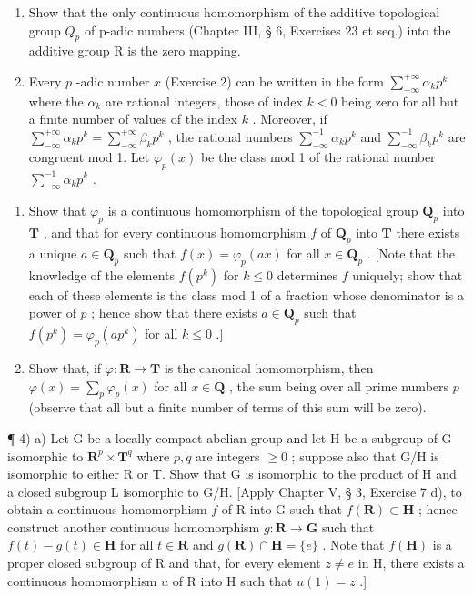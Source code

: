 \begin{enumerate}
\def\labelenumi{\arabic{enumi})}
\setcounter{enumi}{1}
\item
  Show that the only continuous homomorphism of the additive topological group \(Q_{p}\) of p-adic numbers (Chapter III, § 6, Exercises 23 et seq.) into the additive group R is the zero mapping.
\item
  Every \(p\) -adic number \(x\) (Exercise 2) can be written in the form \(\sum_{-\infty}^{+\infty} \alpha_k p^k\) where the \(\alpha_k\) are rational integers, those of index \(k < 0\) being zero for all but a finite number of values of the index \(k\) . Moreover, if \(\sum_{-\infty}^{+\infty} \alpha_k p^k = \sum_{-\infty}^{+\infty} \beta_k p^k\) , the rational numbers \(\sum_{-\infty}^{-1} \alpha_k p^k\) and \(\sum_{-\infty}^{-1} \beta_k p^k\) are congruent mod 1. Let \(\varphi_p(x)\) be the class mod 1 of the rational number \(\sum_{-\infty}^{-1} \alpha_k p^k\) .\\
\end{enumerate}

\begin{enumerate}
\def\labelenumi{\alph{enumi})}
\tightlist
\item
  Show that \(\varphi_p\) is a continuous homomorphism of the topological group \(\mathbf{Q}_p\) into \(\mathbf{T}\) , and that for every continuous homomorphism \(f\) of \(\mathbf{Q}_p\) into \(\mathbf{T}\) there exists a unique \(a \in \mathbf{Q}_p\) such that \(f(x) = \varphi_p(ax)\) for all \(x \in \mathbf{Q}_p\) . {[}Note that the knowledge of the elements \(f(p^k)\) for \(k \leqslant 0\) determines \(f\) uniquely; show that each of these elements is the class mod 1 of a fraction whose denominator is a power of \(p\) ; hence show that there exists \(a \in \mathbf{Q}_p\) such that \(f(p^k) = \varphi_p(ap^k)\) for all \(k \leqslant 0\) .{]}\\
\item
  Show that, if \(\varphi: \mathbf{R} \to \mathbf{T}\) is the canonical homomorphism, then \(\varphi(x) = \sum_{p} \varphi_p(x)\) for all \(x \in \mathbf{Q}\) , the sum being over all prime numbers \(p\) (observe that all but a finite number of terms of this sum will be zero).
\end{enumerate}

¶ 4) a) Let G be a locally compact abelian group and let H be a subgroup of G isomorphic to \(\mathbf{R}^{p} \times \mathbf{T}^{q}\) where \(p, q\) are integers \(\geqslant 0\) ; suppose also that G/H is isomorphic to either R or T. Show that G is isomorphic to the product of H and a closed subgroup L isomorphic to G/H. {[}Apply Chapter V, § 3, Exercise 7 d), to obtain a continuous homomorphism \(f\) of R into G such that \(f(\mathbf{R}) \subset \mathbf{H}\) ; hence construct another continuous homomorphism \(g: \mathbf{R} \to \mathbf{G}\) such that \(f(t) - g(t) \in \mathbf{H}\) for all \(t \in \mathbf{R}\) and \(g(\mathbf{R}) \cap \mathbf{H} = \{e\}\) . Note that \(f(\mathbf{H})\) is a proper closed subgroup of R and that, for every element \(z \neq e\) in H, there exists a continuous homomorphism \(u\) of R into H such that \(u(1) = z\) .{]}

